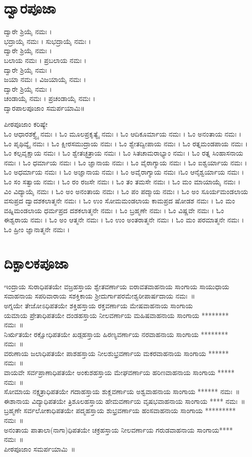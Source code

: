 \section{ದ್ವಾರಪೂಜಾ}
ದ್ವಾರೇ ಶ್ರಿಯೈ  ನಮಃ ।\\
ಭದ್ರಾಯೈ ನಮಃ ।
ಸುಭದ್ರಾಯೈ ನಮಃ ।\\
ದ್ವಾರೇ ಶ್ರಿಯೈ  ನಮಃ ।\\
ಬಲಾಯ ನಮಃ ।
ಪ್ರಬಲಾಯ ನಮಃ ।\\
ದ್ವಾರೇ ಶ್ರಿಯೈ  ನಮಃ ।\\
ಜಯಾ ನಮಃ ।
ವಿಜಯಾಯೈ ನಮಃ ।\\
ದ್ವಾರೇ ಶ್ರಿಯೈ  ನಮಃ ।\\
ಚಂಡಾಯೈ ನಮಃ ।
ಪ್ರಚಂಡಾಯೈ ನಮಃ ।\\ದ್ವಾರಪಾಲಪೂಜಾಂ ಸಮರ್ಪಯಾಮಿ॥

ಪೀಠಪೂಜಾಂ ಕರಿಷ್ಯೇ\\
 ಓಂ ಆಧಾರಶಕ್ತ್ಯೈ ನಮಃ । ಓಂ ಮೂಲಪ್ರಕೃತ್ಯೈ ನಮಃ । ಓಂ ಆದಿಕೂರ್ಮಾಯ ನಮಃ । ಓಂ ಅನಂತಾಯ ನಮಃ । ಓಂ ಪೃಥಿವ್ಯೈ ನಮಃ । ಓಂ ಕ್ಷೀರಸಮುದ್ರಾಯ ನಮಃ । ಓಂ ಶ್ವೇತದ್ವೀಪಾಯ ನಮಃ । ಓಂ ರತ್ನಮಂಡಪಾಯ ನಮಃ । ಓಂ ಕಲ್ಪವೃಕ್ಷಾಯ ನಮಃ । ಓಂ ಶ್ವೇತಚ್ಛತ್ರಾಯ ನಮಃ । ಓಂ ಸಿತಚಾಮರಾಭ್ಯಾಂ ನಮಃ । ಓಂ ರತ್ನ ಸಿಂಹಾಸನಾಯ ನಮಃ । ಓಂ ಧರ್ಮಾಯ ನಮಃ । ಓಂ ಜ್ಞಾನಾಯ ನಮಃ । ಓಂ ವೈರಾಗ್ಯಾಯ ನಮಃ । ಓಂ ಐಶ್ವರ್ಯಾಯ ನಮಃ । ಓಂ ಅಧರ್ಮಾಯ ನಮಃ । ಓಂ ಅಜ್ಞಾನಾಯ ನಮಃ । ಓಂ ಅವೈರಾಗ್ಯಾಯ ನಮಃ ।ಓಂ ಆನೈಶ್ವರ್ಯಾಯ ನಮಃ । ಓಂ ಸಂ ಸತ್ವಾಯ ನಮಃ । ಓಂ ರಂ ರಜಸೇ ನಮಃ । ಓಂ ತಂ ತಮಸೇ ನಮಃ । ಓಂ ಮಂ ಮಾಯಾಯೈ ನಮಃ । ವಿಂ ವಿದ್ಯಾಯೈ ನಮಃ । ಓಂ ಅಂ ಅನಂತಾಯ ನಮಃ । ಓಂ ಪಂ ಪದ್ಮಾಯ ನಮಃ ।  ಓಂ ಅಂ ಸೂರ್ಯಮಂಡಲಾಯ ವಸುಪ್ರದ ದ್ವಾದಶಕಲಾತ್ಮನೇ ನಮಃ । ಓಂ ಉಂ ಸೋಮಮಂಡಲಾಯ ಕಾಮಪ್ರದ ಷೋಡಶ ನಮಃ । ಓಂ ಮಂ ವಹ್ನಿಮಂಡಲಾಯ ಧರ್ಮಪ್ರದ ದಶಕಲಾತ್ಮನೇ ನಮಃ । ಓಂ  ಬ್ರಹ್ಮಣೇ ನಮಃ ।  ಓಂ ವಿಷ್ಣವೇ ನಮಃ ।  ಓಂ ಈಶ್ವರಾಯ ನಮಃ । ಓಂ ಅಂ ಆತ್ಮನೇ ನಮಃ । ಓಂ ಉಂ ಅಂತರಾತ್ಮನೇ ನಮಃ । ಓಂ ಮಂ ಪರಮಾತ್ಮನೇ ನಮಃ । ಓಂ ಹ್ರೀಂ ಜ್ಞಾನಾತ್ಮನೇ ನಮಃ ।

\section{ದಿಕ್ಪಾಲಕಪೂಜಾ}
 ಇಂದ್ರಾಯ ಸುರಾಧಿಪತಯೇ ವಜ್ರಹಸ್ತಾಯ ಶ್ವೇತವರ್ಣಾಯ ಐರಾವತವಾಹನಾಯ ಸಾಂಗಾಯ ಸಾಯುಧಾಯ ಸವಾಹನಾಯ ಸಪರಿವಾರಾಯ ಸಶಕ್ತಿಕಾಯ  ಶ್ರೀದುರ್ಗಾಪರಮೇಶ್ವರೀಪಾರ್ಷದಾಯ ನಮಃ~॥\\
 ಅಗ್ನಯೇ ತೇಜೋಽಧಿಪತಯೇ ಶಕ್ತಿಹಸ್ತಾಯ ರಕ್ತವರ್ಣಾಯ ಮೇಷವಾಹನಾಯ ಸಾಂಗಾಯ\\
 ಯಮಾಯ ಪ್ರೇತಾಧಿಪತಯೇ ದಂಡಹಸ್ತಾಯ ನೀಲವರ್ಣಾಯ ಮಹಿಷವಾಹನಾಯ ಸಾಂಗಾಯ ******** ನಮಃ~॥\\
 ನಿರ್ಋತಯೇ ರಕ್ಷೋಧಿಪತಯೇ ಖಡ್ಗಹಸ್ತಾಯ ಹಿರಣ್ಯವರ್ಣಾಯ ನರವಾಹನಾಯ ಸಾಂಗಾಯ ******** ನಮಃ~॥\\
 ವರುಣಾಯ ಜಲಾಧಿಪತಯೇ ಪಾಶಹಸ್ತಾಯ ನೀಲಶುಭ್ರವರ್ಣಾಯ ಮಕರವಾಹನಾಯ ಸಾಂಗಾಯ ****** ನಮಃ~॥\\
 ವಾಯವೇ ಸರ್ವಪ್ರಾಣಾಧಿಪತಯೇ ಅಂಕುಶಹಸ್ತಾಯ ಮೇಘವರ್ಣಾಯ ಹರಿಣವಾಹನಾಯ ಸಾಂಗಾಯ  ***** ನಮಃ~॥\\
 ಸೋಮಾಯ ನಕ್ಷತ್ರಾಧಿಪತಯೇ ಗದಾಹಸ್ತಾಯ ಶುಕ್ಲವರ್ಣಾಯ ಅಶ್ವವಾಹನಾಯ ಸಾಂಗಾಯ ****** ನಮಃ~॥\\
 ಈಶಾನಾಯ ವಿದ್ಯಾಧಿಪತಯೇ ತ್ರಿಶೂಲಹಸ್ತಾಯ ಹೇಮವರ್ಣಾಯ ವೃಷಭವಾಹನಾಯ ಸಾಂಗಾಯ **** ನಮಃ~॥\\
 ಬ್ರಹ್ಮಣೇ ಸರ್ವಲೋಕಾಧಿಪತಯೇ ಪದ್ಮಹಸ್ತಾಯ ಶುಭ್ರವರ್ಣಾಯ ಹಂಸವಾಹನಾಯ  ಸಾಂಗಾಯ ********* ನಮಃ~॥\\
  ಅನಂತಾಯ ಪಾತಾಲಾ(ನಾಗಾ)ಧಿಪತಯೇ ಚಕ್ರಹಸ್ತಾಯ ನೀಲವರ್ಣಾಯ ಗರುಡವಾಹನಾಯ  ಸಾಂಗಾಯ**** ನಮಃ~॥\\
ಪೀಠಪೂಜಾಂ ಸಮರ್ಪಯಾಮಿ~॥
